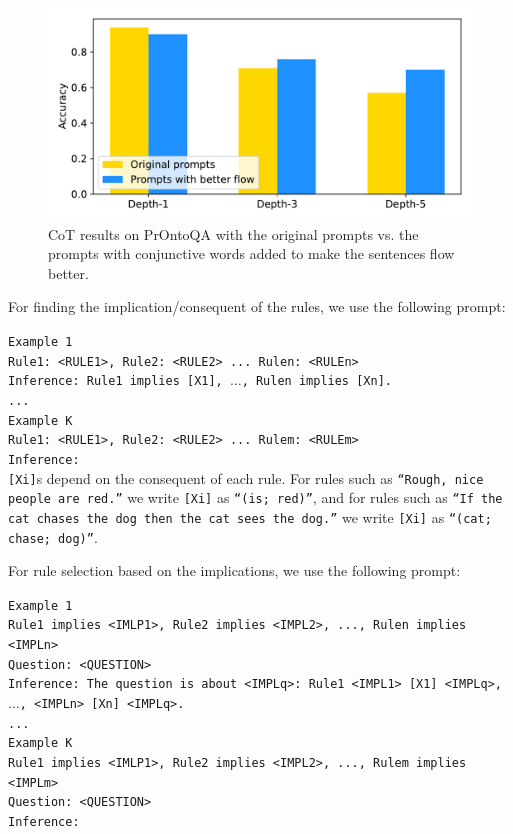 \documentclass[11pt]{article}
\begin{document}
\begin{figure}[t]
  \centering
  \includegraphics[width=\columnwidth]{cot_prompts.pdf}
  \caption{%
  \label{fig:cot-prompts} %
    CoT results on PrOntoQA with the original prompts vs. the prompts with conjunctive words added to make the sentences flow better.
  }
\end{figure}

For finding the implication/consequent of the rules, we use the following prompt:

\indent \texttt{Example 1}\\
\indent \texttt{Rule1: <RULE1>, Rule2: <RULE2> ... Rulen: <RULEn>}\\
\indent \texttt{Inference: Rule1 implies [X1], $\dots$, Rulen implies [Xn].}\\
\indent \texttt{...}\\
\indent \texttt{Example K}\\
\indent \texttt{Rule1: <RULE1>, Rule2: <RULE2> ... Rulem: <RULEm>}\\
\indent \texttt{Inference: }\\

\texttt{[Xi]}s depend on the consequent of each rule. For rules such as \texttt{``Rough, nice people are red.''} we write \texttt{[Xi]} as \texttt{``(is; red)''}, and for rules such as \texttt{``If the cat chases the dog then the cat sees the dog.''} we write \texttt{[Xi]} as \texttt{``(cat; chase; dog)''}.

For rule selection based on the implications, we use the following prompt:

\indent \texttt{Example 1}\\
\indent \texttt{Rule1 implies <IMLP1>, Rule2 implies <IMPL2>, ..., Rulen implies <IMPLn>}\\
\indent \texttt{Question: <QUESTION>}\\
\indent \texttt{Inference: The question is about <IMPLq>: Rule1 <IMPL1> [X1] <IMPLq>, $\dots$, <IMPLn> [Xn] <IMPLq>.}\\
\indent \texttt{...}\\
\indent \texttt{Example K}\\
\indent \texttt{Rule1 implies <IMLP1>, Rule2 implies <IMPL2>, ..., Rulem implies <IMPLm>}\\
\indent \texttt{Question: <QUESTION>}\\
\indent \texttt{Inference: }\\
\end{document}
